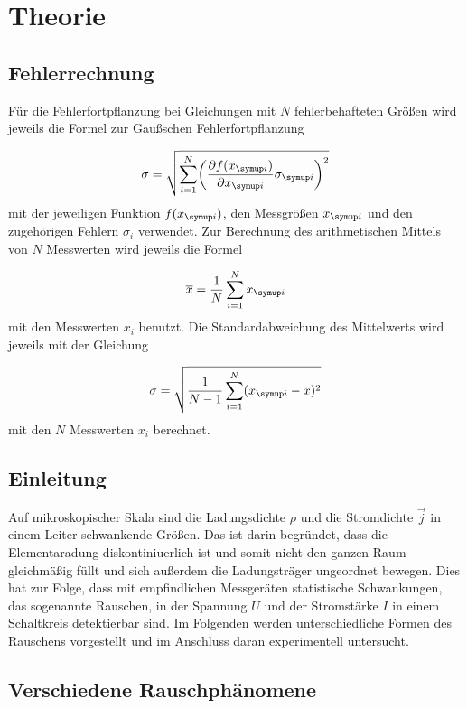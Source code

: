\section{Theorie}
\label{sec:Theorie}

\subsection{Fehlerrechnung}

Für die Fehlerfortpflanzung bei Gleichungen mit $N$ fehlerbehafteten Größen
wird jeweils die Formel zur Gaußschen Fehlerfortpflanzung

\begin{equation*}
  \sigma = \sqrt{\sum_{i=1}^{N}\biggl(\frac{\partial f(x_{\g{i}})}{\partial x_{\g{i}}}
  \sigma_{\g{i}}\biggr)^2}
\end{equation*}
mit der jeweiligen Funktion $f(x_{\g{i}})$, den Messgrößen $x_{\g{i}}$ und den
zugehörigen Fehlern $\sigma_i$ verwendet.
Zur Berechnung des arithmetischen Mittels von $N$ Messwerten wird jeweils die
Formel

\begin{equation*}
  \overline{x} = \frac{1}{N}\sum_{i=1}^{N}x_{\g{i}}
\end{equation*}
mit den Messwerten $x_i$ benutzt.
Die Standardabweichung des Mittelwerts wird jeweils mit der Gleichung

\begin{equation*}
  \overline{\sigma} = \sqrt{\frac{1}{N-1}\sum_{i=1}^{N}(x_{\g{i}} - \overline{x})^2}
\end{equation*}
mit den $N$ Messwerten $x_i$ berechnet.

\subsection{Einleitung}

Auf mikroskopischer Skala sind die Ladungsdichte $\rho$ und die Stromdichte $\vec{j}$ in einem Leiter
schwankende Größen. Das ist darin begründet, dass die Elementaradung diskontiniuerlich ist und somit nicht den
ganzen Raum gleichmäßig füllt und sich außerdem die Ladungsträger ungeordnet bewegen. Dies hat zur Folge, dass
mit empfindlichen Messgeräten statistische Schwankungen, das sogenannte Rauschen, in der Spannung $U$ und der
Stromstärke $I$ in einem Schaltkreis detektierbar sind. Im Folgenden werden unterschiedliche Formen
des Rauschens vorgestellt und im Anschluss daran experimentell untersucht.

\subsection{Verschiedene Rauschphänomene}

